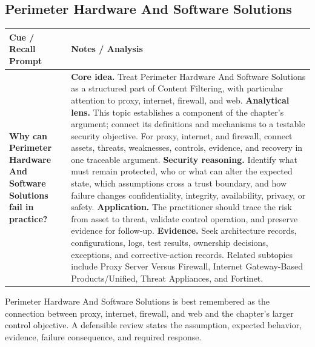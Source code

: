 \documentclass[11pt]{article}
\newcommand{\CornellHeader}{%
\rowcolor{Navy}\color{white}\bfseries Cue / Recall Prompt & \color{white}\bfseries Notes / Analysis\\\hline}
\newcommand{\CornellRow}[2]{%
\cellcolor{CueGray}\RaggedRight\textbf{#1} & \RaggedRight #2\\\hline}
\begin{document}
\subsection*{Perimeter Hardware And Software Solutions}
\begin{longtable}{>{\RaggedRight\arraybackslash}p{}|>{\RaggedRight\arraybackslash}p{}}
\CornellHeader
\CornellRow{Why can Perimeter Hardware And Software Solutions fail in practice?}{\textbf{Core idea.} Treat Perimeter Hardware And Software Solutions as a structured part of Content Filtering, with particular attention to proxy, internet, firewall, and web. \textbf{Analytical lens.} This topic establishes a component of the chapter's argument; connect its definitions and mechanisms to a testable security objective. For proxy, internet, and firewall, connect assets, threats, weaknesses, controls, evidence, and recovery in one traceable argument. \textbf{Security reasoning.} Identify what must remain protected, who or what can alter the expected state, which assumptions cross a trust boundary, and how failure changes confidentiality, integrity, availability, privacy, or safety. \textbf{Application.} The practitioner should trace the risk from asset to threat, validate control operation, and preserve evidence for follow-up. \textbf{Evidence.} Seek architecture records, configurations, logs, test results, ownership decisions, exceptions, and corrective-action records. Related subtopics include Proxy Server Versus Firewall, Internet Gateway-Based Products/Unified, Threat Appliances, and Fortinet.}
\end{longtable}
\begin{topicsummary}
Perimeter Hardware And Software Solutions is best remembered as the connection between proxy, internet, firewall, and web and the chapter's larger control objective. A defensible review states the assumption, expected behavior, evidence, failure consequence, and required response.
\end{topicsummary}
\end{document}
